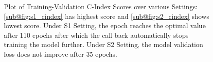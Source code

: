 \begin{figure}[tbp]\centering
    \qquad
    \caption[Concordance Score during Training (a)]{Plot of Training-Validation C-Index Scores over various Settings: 
    \ref{sub@fig:s1_cindex} has highest score and \ref{sub@fig:s2_cindex} shows lowest score. Under S1 Setting, the epoch reaches the optimal value after 110 epochs after which the call back automatically stops training the model further. Under S2 Setting, the model validation loss does not improve after 35 epochs.
    }
    \label{fig:ci_curve}
\end{figure}


